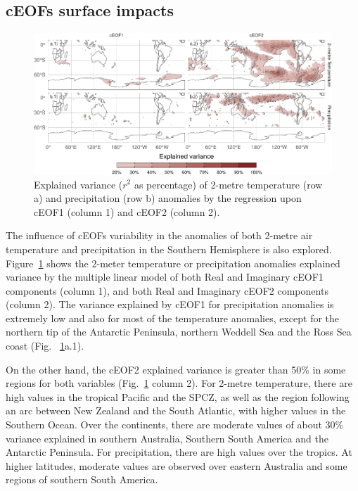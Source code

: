 \documentclass[smallextended]{svjour3}       %
\begin{document}
\hypertarget{precipitation}{%
\subsection{cEOFs surface impacts}\label{precipitation}}

\begin{figure}
\centering
\includegraphics{../figures/pp-t2m-r2-1.pdf}
\caption{\label{fig:pp-t2m-r2}Explained variance (\(r^2\) as percentage) of 2-metre temperature (row a) and precipitation (row b) anomalies by the regression upon cEOF1 (column 1) and cEOF2 (column 2).}
\end{figure}



The influence of cEOFs variability in the anomalies of both 2-metre air temperature and precipitation in the Southern Hemisphere is also explored.
Figure~\ref{fig:pp-t2m-r2} shows the 2-meter temperature or precipitation anomalies explained variance by the multiple linear model of both Real and Imaginary cEOF1 components (column 1), and both Real and Imaginary cEOF2 components (column 2).
The variance explained by cEOF1 for precipitation anomalies is extremely low and also for most of the temperature anomalies, except for the northern tip of the Antarctic Peninsula, northern Weddell Sea and the Ross Sea coast (Fig.~ \ref{fig:pp-t2m-r2}a.1).

On the other hand, the cEOF2 explained variance is greater than 50\% in some regions for both variables (Fig.~\ref{fig:pp-t2m-r2} column 2).
For 2-metre temperature, there are high values in the tropical Pacific and the SPCZ, as well as the region following an arc between New Zealand and the South Atlantic, with higher values in the Southern Ocean.
Over the continents, there are moderate values of about 30\% variance explained in southern Australia, Southern South America and the Antarctic Peninsula.
For precipitation, there are high values over the tropics. At higher latitudes, moderate values are observed over eastern Australia and some regions of southern South America.
\end{document}
